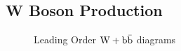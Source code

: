 \subsection{W Boson Production}
\begin{figure}[t]
\centering
  \begin{subfigure}[b]{.35\textwidth}
	\end{subfigure}	
   \begin{subfigure}[b]{.35\textwidth}
    \end{subfigure}	
  	\caption[Leading Order $\Wbb$ diagrams]
   	{Leading Order $\Wbb$ diagrams}

	\label{fig:WbbLO}
\end{figure}

